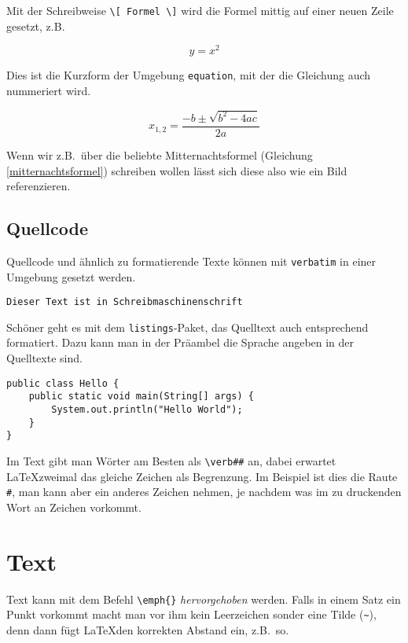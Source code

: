 Mit der Schreibweise \verb|\[ Formel \]| wird die Formel mittig auf einer neuen Zeile gesetzt, z.B.

\[y = x^2 \]

Dies ist die Kurzform der Umgebung \verb|equation|, mit der die Gleichung auch nummeriert wird. 

\begin{equation}
x_{1,2} = \frac{-b\pm\sqrt{b^2-4ac}}{2a}
\label{mitternachtsformel}
\end{equation}

Wenn wir z.B.~über die beliebte Mitternachtsformel (Gleichung \ref{mitternachtsformel}) schreiben wollen lässt sich diese also wie ein Bild referenzieren.



\subsection{Quellcode}

Quellcode und ähnlich zu formatierende Texte können mit \verb|verbatim| in einer Umgebung gesetzt werden.

\begin{verbatim}
Dieser Text ist in Schreibmaschinenschrift
\end{verbatim}

Schöner geht es mit dem \verb|listings|-Paket, das Quelltext auch entsprechend formatiert. Dazu kann man in der Präambel die Sprache angeben in der Quelltexte sind.

\begin{lstlisting}
public class Hello {
    public static void main(String[] args) {
        System.out.println("Hello World");
    }
}
\end{lstlisting}

Im Text gibt man Wörter am Besten als \verb|\verb##| an, dabei erwartet \LaTeX zweimal das gleiche Zeichen als Begrenzung. Im Beispiel ist dies die Raute \verb|#|, man kann aber ein anderes Zeichen nehmen, je nachdem was im zu druckenden Wort an Zeichen vorkommt.



\section{Text}

Text kann mit dem Befehl \verb|\emph{}| \emph{hervorgehoben} werden. Falls in einem Satz ein Punkt vorkommt macht man vor ihm kein Leerzeichen sonder eine Tilde (\verb|~|), denn dann fügt \LaTeX den korrekten Abstand ein, z.B.~so.

